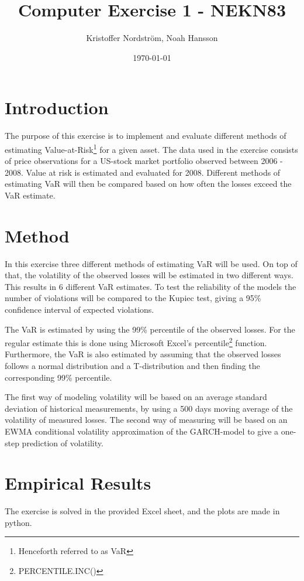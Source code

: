 \documentclass[a4paper]{article}
\title{Computer Exercise 1 - NEKN83}
\author{Kristoffer Nordström, Noah Hansson}
\date{\today}
\begin{document}
\maketitle

\section{Introduction}
The purpose of this exercise is to implement and evaluate different methods of estimating Value-at-Risk\footnote{Henceforth referred to as VaR} for a given asset. The data used in the exercise consists of price observations for a US-stock market portfolio observed between 2006 - 2008. Value at risk is estimated and evaluated for 2008. Different methods of estimating VaR will then be compared based on how often the losses exceed the VaR estimate.

\section{Method}
In this exercise three different methods of estimating VaR will be used. On top of that, the volatility of the observed losses will be estimated in two different ways. This results in 6 different VaR estimates. To test the reliability of the models the number of violations will be compared to the Kupiec test, giving a 95\% confidence interval of expected violations.
   
The VaR is estimated by using the 99\% percentile of the observed losses. For the regular estimate this is done using Microsoft Excel's percentile\footnote{PERCENTILE.INC()} function. Furthermore, the VaR is also estimated by assuming that the observed losses follows a normal distribution and a T-distribution and then finding the corresponding 99\% percentile.

The first way of modeling volatility will be based on an average standard deviation of historical measurements, by using a 500 days moving average of the volatility of measured losses. The second way of measuring will be based on an EWMA conditional volatility approximation of the GARCH-model to give a one-step prediction of volatility.



\section{Empirical Results}
The exercise is solved in the provided Excel sheet, and the plots are made in python. 
\end{document}
